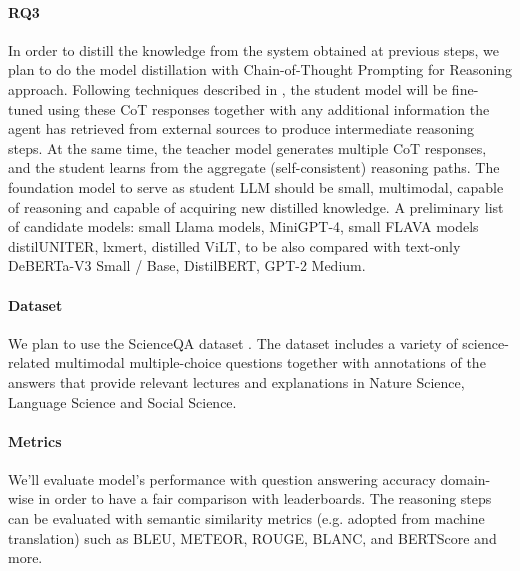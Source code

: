 \documentclass[10pt]{article}
\begin{document}
\paragraph{RQ3}
In order to distill the knowledge from the system obtained at previous steps, we plan to do the model distillation with Chain-of-Thought Prompting for Reasoning approach. Following techniques described in \cite{magister2022teaching} \cite{wei2022chain}, the student model will be fine-tuned using these CoT responses together with any additional information the agent has retrieved from external sources to produce intermediate reasoning steps. At the same time, the teacher model generates multiple CoT responses, and the student learns from the aggregate (self-consistent) reasoning paths. 
The foundation model to serve as student LLM should be small, multimodal, capable of reasoning and capable of acquiring new distilled knowledge. A preliminary list of candidate models: small Llama models, MiniGPT-4, small FLAVA models distilUNITER, lxmert, distilled ViLT, to be also compared with text-only DeBERTa-V3 Small / Base, DistilBERT, GPT-2 Medium.

\paragraph{Dataset}
We plan to use the ScienceQA dataset \cite{lu2022learn}. The dataset includes a variety of science-related multimodal multiple-choice questions together with annotations of the answers that provide relevant lectures and explanations in Nature Science, Language Science and Social Science.

\paragraph{Metrics}
We'll evaluate model's performance with question answering accuracy domain-wise in order to have a fair comparison with leaderboards. The reasoning steps can be evaluated with semantic similarity metrics (e.g. adopted from machine translation) such as BLEU, METEOR, ROUGE, BLANC, and BERTScore and more.
\end{document}
